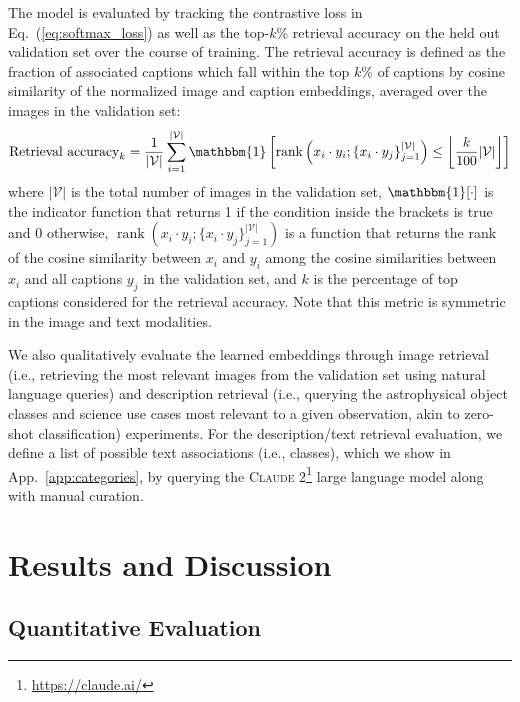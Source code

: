 \documentclass[10pt]{article} %
\newcommand{\eqrefb}[1]{(\ref{#1})}
\begin{document}
The model is evaluated by tracking the contrastive loss in Eq.~\eqrefb{eq:softmax_loss} as well as the top-$k\%$ retrieval accuracy on the held out validation set over the course of training.
%
The retrieval accuracy is defined as the fraction of associated captions which fall within the top $k\%$ of captions by cosine similarity of the normalized image and caption embeddings, averaged over the images in the validation set:
\begin{equation}
\text{Retrieval accuracy}_k = \frac{1}{|\mathcal V|} \sum_{i=1}^{|\mathcal V|} \mathbbm{1}\left[\operatorname{rank}\left({x}_i \cdot {y}_{i}; \{{x}_i \cdot {y}_{j}\}_{j=1}^{|\mathcal V|}\right) \leq \left\lfloor\frac{k}{100}|\mathcal V|\right\rfloor\right]
\label{eq:retrieval_accuracy}
\end{equation}
where $|\mathcal V|$ is the total number of images in the validation set, $\mathbbm{1}[\cdot]$ is the indicator function that returns 1 if the condition inside the brackets is true and 0 otherwise, $\operatorname{rank}\left({x}_i \cdot {y}_{i}; \{{x}_i \cdot {y}_{j}\}_{j=1}^{|\mathcal V|}\right)$ is a function that returns the rank of the cosine similarity between ${x}_i$ and ${y}_{i}$ among the cosine similarities between ${x}_i$ and all captions ${y}_j$ in the validation set, and $k$ is the percentage of top captions considered for the retrieval accuracy. Note that this metric is symmetric in the image and text modalities.

We also qualitatively evaluate the learned embeddings through image retrieval (i.e., retrieving the most relevant images from the validation set using natural language queries) and description retrieval (i.e., querying the astrophysical object classes and science use cases most relevant to a given observation, akin to zero-shot classification) experiments. 
%
For the description/text retrieval evaluation, we define a list of possible text associations (i.e., classes), which we show in App.~\ref{app:categories}, by querying the \textsc{Claude 2}\footnote{\url{https://claude.ai/}} large language model along with manual curation.

\section{Results and Discussion}
\label{sec:results}

\subsection{Quantitative Evaluation}
\end{document}
